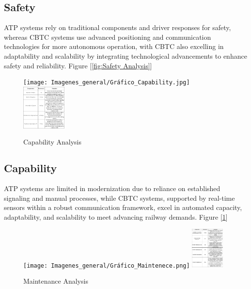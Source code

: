 \documentclass[conference]{IEEEtran}
\begin{document}
\subsection{Safety}
ATP systems rely on traditional components and driver responses for safety, whereas CBTC systems use advanced positioning and communication technologies for more autonomous operation, with CBTC also excelling in adaptability and scalability by integrating technological advancements to enhance safety and reliability. Figure [\ref{fig:Safety Analysis}]\\
\begin{figure}[htbp]
    \centering
    \texttt{[image: Imagenes\_general/Gráfico\_Capability.jpg]}
    \includegraphics[width=0.20\textwidth,scale=1]{Imagenes_general/Tabla_Capability.png}
    \caption{Capability Analysis}
    \label{fig:Capability Analysis}
\end{figure}
\subsection{Capability}
ATP systems are limited in modernization due to reliance on established signaling and manual processes, while CBTC systems, supported by real-time sensors within a robust communication framework, excel in automated capacity, adaptability, and scalability to meet advancing railway demands. Figure [\ref{fig:Capability Analysis}]\\
\begin{figure}[htbp]
    \centering
        \texttt{[image: Imagenes\_general/Gráfico\_Maintenece.png]}
    \includegraphics[width=0.15\textwidth,scale=1]{Imagenes_general/Tabla_Maintenece.jpg}
    \caption{Maintenance Analysis}
    \label{fig:Maintenance Analysis}
\end{figure}
\end{document}

